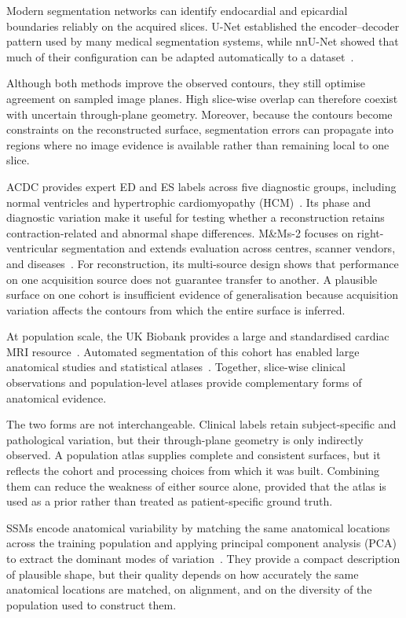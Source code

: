 Modern segmentation networks can identify endocardial and epicardial boundaries
reliably on the acquired slices. U-Net established the encoder--decoder pattern
used by many medical segmentation systems, while nnU-Net showed that much of
their configuration can be adapted automatically to a dataset~\parencite{ronneberger2015unet,isensee2021nnunet}. 

Although both methods improve
the observed contours, they still optimise agreement on sampled image planes.
High slice-wise overlap can therefore coexist with uncertain through-plane
geometry. Moreover, because the contours become constraints on the reconstructed
surface, segmentation errors can propagate into regions where no image evidence
is available rather than remaining local to one slice.

ACDC provides expert ED and ES labels across five diagnostic groups, including
normal ventricles and hypertrophic cardiomyopathy (HCM)~\parencite{bernard2018acdc}. Its phase and
diagnostic variation make it useful for testing whether a reconstruction retains
contraction-related and abnormal shape differences. M\&Ms-2 focuses on right-ventricular segmentation and extends evaluation across centres,
scanner vendors, and diseases~\parencite{martinisla2023mnms2}. For
reconstruction, its multi-source design shows that performance on one acquisition
source does not guarantee transfer to another. A plausible surface on one cohort
is insufficient evidence of generalisation because acquisition variation affects
the contours from which the entire surface is inferred.

At population scale, the UK Biobank provides a large and standardised cardiac
MRI resource~\parencite{sudlow2015ukbiobank}. Automated segmentation of this
cohort has enabled large anatomical studies and statistical atlases~\parencite{bai2018automated}. Together, slice-wise clinical observations and
population-level atlases provide complementary forms of anatomical evidence.

The two forms are not interchangeable. Clinical labels retain subject-specific
and pathological variation, but their through-plane geometry is only indirectly
observed. A population atlas supplies complete and consistent surfaces, but it
reflects the cohort and processing choices from which it was built. Combining
them can reduce the weakness of either source alone, provided that the atlas is
used as a prior rather than treated as patient-specific ground truth.

SSMs encode anatomical variability by matching the same anatomical locations
across the training population and applying principal
component analysis (PCA) to extract
the dominant modes of variation~\parencite{cootes1995asm,heimann2009ssmreview}.
They provide a compact description of plausible shape, but their quality depends
on how accurately the same anatomical locations are matched, on alignment, and
on the diversity of the population used to construct them.

